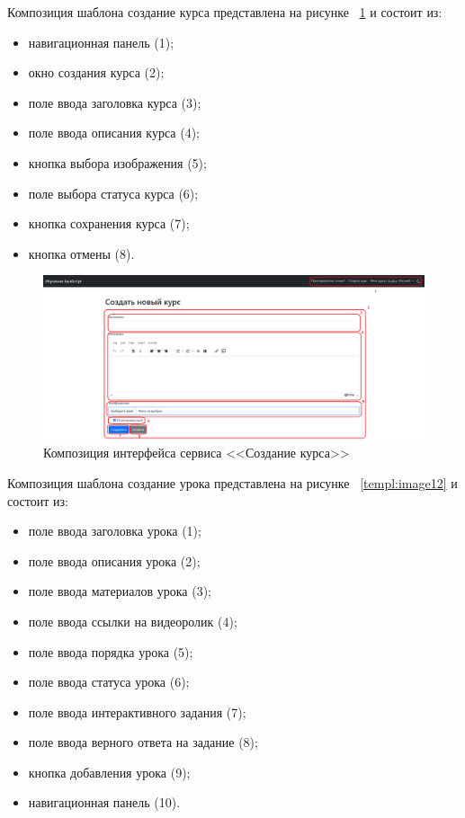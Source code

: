 Композиция шаблона создание курса представлена на рисунке ~\ref{templ:image11} и состоит из:

\begin{itemize}
	\item навигационная панель (1);
	\item окно создания курса (2);
	\item поле ввода заголовка курса (3);
	\item поле ввода описания курса (4);
	\item кнопка выбора изображения (5);
	\item поле выбора статуса курса (6);
	\item кнопка сохранения курса (7);
	\item кнопка отмены (8).
\end{itemize}

\begin{figure}[h]
	\centering
	\includegraphics[width=0.9\linewidth]{images/создатькурс}
	\caption{Композиция интерфейса сервиса <<Создание курса>>}
	\label{templ:image11}
\end{figure}


Композиция шаблона создание урока представлена на рисунке ~\ref{templ:image12} и состоит из:

\begin{itemize}
	\item поле ввода заголовка урока (1);
	\item поле ввода описания урока (2);
	\item поле ввода материалов урока (3);
	\item поле ввода ссылки на видеоролик (4);
	\item поле ввода порядка урока (5);
	\item поле ввода статуса урока (6);
	\item поле ввода интерактивного задания (7);
	\item поле ввода верного ответа на задание (8);
	\item кнопка добавления урока (9);
	\item навигационная панель (10).
\end{itemize}

